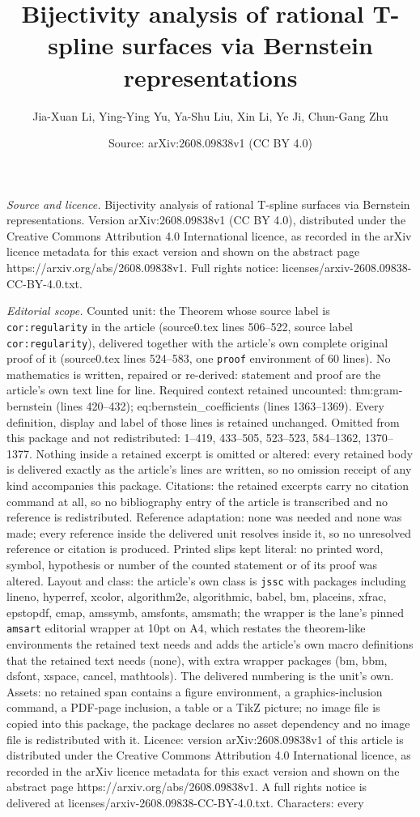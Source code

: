\documentclass[10pt,a4paper]{amsart}
\title[Bijectivity analysis of rational T-spline surfaces via Berns]{Bijectivity analysis of rational T-spline surfaces via Bernstein representations}
\author{Jia-Xuan Li, Ying-Ying Yu, Ya-Shu Liu, Xin Li, Ye Ji, Chun-Gang Zhu}
\date{Source: arXiv:2608.09838v1 (CC BY 4.0)}
\begin{document}
\maketitle

\noindent\emph{Source and licence.} Bijectivity analysis of rational T-spline surfaces via Bernstein representations. Version arXiv:2608.09838v1 (CC BY 4.0), distributed under the Creative Commons Attribution 4.0 International licence, as recorded in the arXiv licence metadata for this exact version and shown on the abstract page https://arxiv.org/abs/2608.09838v1. Full rights notice: licenses/arxiv-2608.09838-CC-BY-4.0.txt.\par\smallskip

\noindent\textit{Editorial scope.} Counted unit: the Theorem whose source label is \texttt{cor:regularity} in the article (source0.tex lines 506--522, source label \texttt{cor:regularity}), delivered together with the article's own complete original proof of it (source0.tex lines 524--583, one \texttt{proof} environment of 60 lines). No mathematics is written, repaired or re-derived: statement and proof are the article's own text line for line. Required context retained uncounted: thm:gram-bernstein (lines 420--432); eq:bernstein\_coefficients (lines 1363--1369). Every definition, display and label of those lines is retained unchanged. Omitted from this package and not redistributed: 1--419, 433--505, 523--523, 584--1362, 1370--1377. Nothing inside a retained excerpt is omitted or altered: every retained body is delivered exactly as the article's lines are written, so no omission receipt of any kind accompanies this package. Citations: the retained excerpts carry no citation command at all, so no bibliography entry of the article is transcribed and no reference is redistributed. Reference adaptation: none was needed and none was made; every reference inside the delivered unit resolves inside it, so no unresolved reference or citation is produced. Printed slips kept literal: no printed word, symbol, hypothesis or number of the counted statement or of its proof was altered. Layout and class: the article's own class is \texttt{jssc} with packages including lineno, hyperref, xcolor, algorithm2e, algorithmic, babel, bm, placeins, xfrac, epstopdf, cmap, amssymb, amsfonts, amsmath; the wrapper is the lane's pinned \texttt{amsart} editorial wrapper at 10pt on A4, which restates the theorem-like environments the retained text needs and adds the article's own macro definitions that the retained text needs (none), with extra wrapper packages (bm, bbm, dsfont, xspace, cancel, mathtools). The delivered numbering is the unit's own. Assets: no retained span contains a figure environment, a graphics-inclusion command, a PDF-page inclusion, a table or a TikZ picture; no image file is copied into this package, the package declares no asset dependency and no image file is redistributed with it. Licence: version arXiv:2608.09838v1 of this article is distributed under the Creative Commons Attribution 4.0 International licence, as recorded in the arXiv licence metadata for this exact version and shown on the abstract page https://arxiv.org/abs/2608.09838v1. A full rights notice is delivered at licenses/arxiv-2608.09838-CC-BY-4.0.txt. Characters: every 
\end{document}
